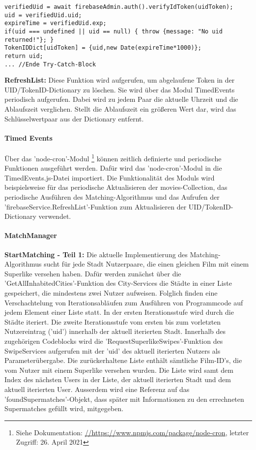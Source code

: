 \begin{lstlisting}[caption=Firebase-Service Register, label=lst:firebaseServiceRegister]
verifiedUid = await firebaseAdmin.auth().verifyIdToken(uidToken);
uid = verifiedUid.uid;
expireTime = verifiedUid.exp;
if(uid === undefined || uid == null) { throw {message: "No uid returned!"}; }
TokenIDDict[uidToken] = {uid,new Date(expireTime*1000)};
return uid;
... //Ende Try-Catch-Block
\end{lstlisting}
   
\noindent
{}
\textbf{RefreshList:}
Diese Funktion wird aufgerufen, um abgelaufene Token in der UID/TokenID-Dictionary zu löschen. Sie wird über das Modul TimedEvents periodisch aufgerufen. Dabei wird zu jedem Paar die aktuelle Uhrzeit und die Ablaufszeit verglichen. Stellt die Ablaufszeit ein größeren Wert dar, wird das Schlüsselwertpaar aus der Dictionary entfernt.

\paragraph{Timed Events}
Über das 'node-cron'-Modul \footnote{Siehe Dokumentation: \url{//https://www.npmjs.com/package/node-cron}, letzter Zugriff: 26. April 2021}
können zeitlich definierte und periodische Funktionen ausgeführt werden. Dafür wird das 'node-cron'-Modul in die TimedEvents.js-Datei importiert. Die Funktionalität des Moduls wird beispielsweise für das periodische Aktualisieren der movies-Collection, das periodische Ausführen des Matching-Algorithmus und das Aufrufen der 'firebaseService.RefreshList'-Funktion zum Aktualisieren der UID/TokenID-Dictionary verwendet.

\paragraph{MatchManager}
\noindent
{}
\textbf{StartMatching - Teil 1:}
Die aktuelle Implementierung des Matching-Algorithmus sucht für jede Stadt Nutzerpaare, die einen gleichen Film mit einem Superlike versehen haben. Dafür werden zunächst über die 'GetAllInhabitedCities'-Funktion des City-Services die Städte in einer Liste gespeichert, die mindestens zwei Nutzer aufweisen. Folglich finden eine Verschachtelung von Iterationsabläufen zum Ausführen von Programmcode auf jedem Element einer Liste statt.
In der ersten Iterationsstufe wird durch die Städte iteriert.
Die zweite Iterationsstufe vom ersten bis zum vorletzten Nutzereintrag ('uid') innerhalb der aktuell iterierten Stadt. Innerhalb des zugehörigen Codeblocks wird die 'RequestSuperlikeSwipes'-Funktion des SwipeServices aufgerufen mit der 'uid' des aktuell iterierten Nutzers als Parameterübergabe. Die zurückerhaltene Liste enthält sämtliche Film-ID's, die vom Nutzer mit einem Superlike versehen wurden. Die Liste wird samt dem Index des nächsten Users in der Liste, der aktuell iterierten Stadt und dem aktuell iterierten User. Ausserdem wird eine Referenz auf das 'foundSupermatches'-Objekt, dass später mit Informationen zu den errechneten Supermatches gefüllt wird, mitgegeben.

